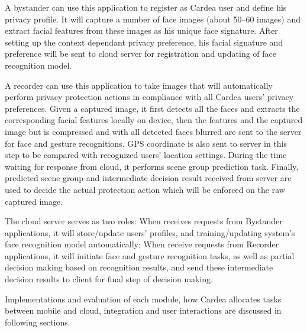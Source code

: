 \begin{description}[leftmargin=0cm]
  \item[{\bfseries Bystander client application:}] A bystander can use this application to register as Cardea user and define his privacy profile. It will capture a number of face images (about 50–60 images) and extract facial features from these images as his unique face signature. After setting up the context dependant privacy preference, his facial signature and preference will be sent to cloud server for registration and updating of face recognition model.
  \item[{\bfseries Recorder client application:}] A recorder can use this application to take images that will automatically perform privacy protection actions in compliance with all Cardea users' privacy preferences. Given a captured image, it first detects all the faces and extracts the corresponding facial features locally on device, then the features and the captured image but is compressed and with all detected faces blurred are sent to the server for face and gesture recognitions. GPS coordinate is also sent to server in this step to be compared with recognized users' location settings. During the time waiting for response from cloud, it performs scene group prediction task. Finally, predicted scene group and intermediate decision result received from server are used to decide the actual protection action which will be enforced on the raw captured image.
  \item[{\bfseries Cloud server:}] The cloud server serves as two roles:  When receives requests from Bystander applications, it will store/update users' profiles, and training/updating system's face recognition model automatically;  When receive requests from Recorder applications, it will initiate face and gesture recognition tasks, as well as partial decision making based on recognition results, and send these intermediate decision results to client for final step of decision making.
\end{description}


Implementations and evaluation of each module, how Cardea allocates tasks between mobile and cloud, integration and user interactions are discussed in following sections.

